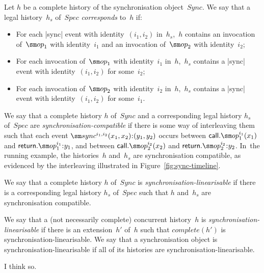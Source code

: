 Let $h$ be a complete history of the synchronisation object~$Sync$.  We say
that a legal history~$h_s$ of~$Spec$ \emph{corresponds} to~$h$ if:
%
\begin{itemize}
\item For each |sync| event with identity~$(i_1,i_2)$ in~$h_s$,\, $h$ contains
  an invocation of~$\op_1$ with identity~$i_1$ and an invocation of~$\op_2$ with
  identity~$i_2$;

\item For each invocation of~$\op_1$ with identity~$i_1$ in~$h$,\, $h_s$
  contains a |sync| event with identity~$(i_1,i_2)$ for some~$i_2$;

\item For each invocation of~$\op_2$ with identity~$i_2$ in~$h$,\, $h_s$
  contains a |sync| event with identity~$(i_1,i_2)$ for some~$i_1$.
\end{itemize}
%

We say that a complete history $h$ of~$Sync$ and a corresponding legal history
$h_s$ of~$Spec$ are \emph{synchronisation-compatible} if there is some way of
interleaving them such that each event $\sync^{i_1, i_2}(x_1, x_2)\:: (y_1,
y_2)$ occurs between $\call.\op_1^{i_1}(x_1)$ and $\return.\op_1^{i_1}\::y_1$,
and between $\call.\op_2^{i_2}(x_2)$ and $\return.\op_2^{i_2}\::y_2$.
%
In~the running example, the histories~$h$ and~$h_s$ are synchronisation
compatible, as evidenced by the interleaving illustrated in
Figure~\ref{fig:sync-timeline}.

We say that a complete history $h$ of~$Sync$ is
\emph{synchronisation-linearisable} if there is a corresponding legal history
$h_s$ of~$Spec$ such that $h$ and~$h_s$ are synchronisation compatible.

We say that a (not necessarily complete) concurrent history~$h$ is
\emph{synchronisation-linearisable} if there is an extension~$h'$ of~$h$ such
that $complete(h')$ is synchronisation-linearisable.  We say that a
synchronisation object is synchronisation-linearisable if all of its histories
are synchronisation-linearisable.



  I think so.
